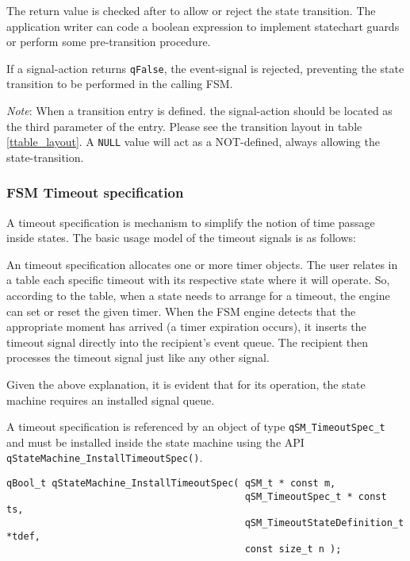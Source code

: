The return value is checked after to allow or reject the state transition. The application writer can code a boolean expression to implement statechart guards or perform some pre-transition procedure.

\begin{tcolorbox}
\HandRight If a signal-action returns \lstinline{qFalse}, the event-signal is rejected, preventing the state transition to be performed in the calling FSM.
\end{tcolorbox}

\begin{tcolorbox}
\ArrowBoldDownRight \textit{Note}: When a transition entry is defined. the signal-action should be located as the third parameter of the entry. Please see the transition layout in table \ref{ttable_layout}.
A \lstinline{NULL} value will act as a NOT-defined, always allowing the state-transition. 
\end{tcolorbox}


\subsubsection{FSM Timeout specification}
A timeout specification is mechanism to simplify the notion of time passage inside states. The basic usage model of the timeout signals is as follows:

An timeout specification allocates one or more timer objects. The user relates in a table each specific timeout with its respective state where it will operate. So, according to the table, when a state needs to arrange for a timeout, the engine can set or reset the given timer.  When the FSM engine detects that the appropriate moment has arrived (a timer expiration occurs), it inserts the timeout signal directly into the recipient's event queue. The recipient then processes the timeout signal just like any other signal.

Given the above explanation, it is evident that for its operation, the state machine requires an installed signal queue.

A timeout specification is referenced by an object of type \lstinline{qSM_TimeoutSpec_t} and must be installed inside the state machine using the API \lstinline{qStateMachine_InstallTimeoutSpec()}.
\medskip

\begin{lstlisting}[style=CStyle]
qBool_t qStateMachine_InstallTimeoutSpec( qSM_t * const m,  
                                          qSM_TimeoutSpec_t * const ts, 
                                          qSM_TimeoutStateDefinition_t *tdef, 
                                          const size_t n );
\end{lstlisting} 

